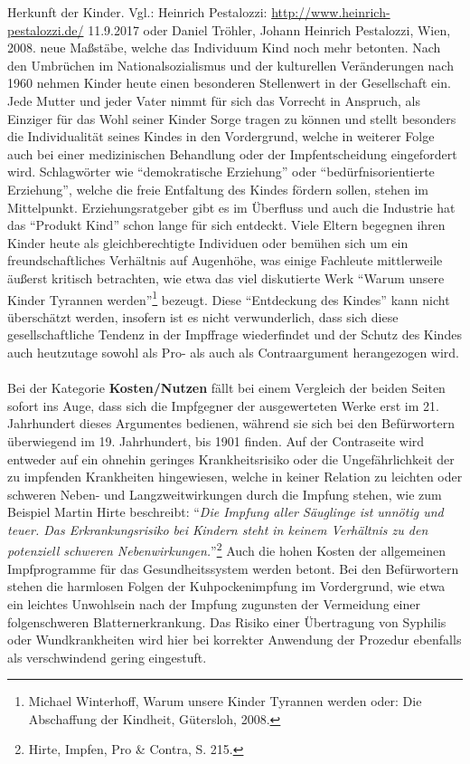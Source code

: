 \documentclass[
    a4paper,
    12pt,
    hyphens,
    chapterprefix=true,
    headheight=33pt,
    footheight=29pt,
    headings=optiontohead, %
]{scrartcl}
\begin{document}
{{Herkunft der Kinder. Vgl.: Heinrich Pestalozzi: \url{http://www.heinrich-pestalozzi.de/} 11.9.2017 oder Daniel Tröhler, Johann Heinrich
Pestalozzi, Wien, 2008.}
 neue Maßstäbe, welche das Individuum Kind noch mehr betonten. Nach den Umbrüchen im Nationalsozialismus und der kulturellen Veränderungen nach 1960 nehmen Kinder heute einen besonderen Stellenwert in der Gesellschaft ein. Jede Mutter und jeder Vater nimmt für sich das Vorrecht in Anspruch, als Einziger für das Wohl seiner Kinder Sorge tragen zu können und stellt besonders die Individualität seines Kindes in den Vordergrund, welche in weiterer Folge auch bei einer medizinischen Behandlung oder der Impfentscheidung eingefordert wird. Schlagwörter wie "`demokratische Erziehung"' oder "`bedürfnisorientierte Erziehung"', welche die freie Entfaltung des Kindes fördern sollen, stehen im Mittelpunkt. Erziehungsratgeber gibt es im Überfluss und auch die Industrie hat das "`Produkt Kind"' schon lange für sich entdeckt. Viele Eltern begegnen ihren Kinder heute als gleichberechtigte Individuen oder bemühen sich um ein freundschaftliches Verhältnis auf Augenhöhe, was einige Fachleute mittlerweile äußerst kritisch betrachten, wie etwa das viel diskutierte Werk "`Warum unsere Kinder Tyrannen werden"'\footnote{Michael Winterhoff, Warum unsere Kinder Tyrannen werden oder: Die Abschaffung der Kindheit, Gütersloh, 2008.} bezeugt. Diese "`Entdeckung des Kindes"' kann nicht überschätzt werden, insofern ist es nicht verwunderlich, dass sich diese gesellschaftliche Tendenz in der Impffrage wiederfindet und der Schutz des Kindes auch heutzutage sowohl als Pro- als auch als Contraargument herangezogen wird.\\
\\
Bei der Kategorie \textbf{Kosten/Nutzen} fällt bei einem Vergleich der beiden Seiten sofort ins Auge, dass sich die Impfgegner der ausgewerteten Werke erst im 21. Jahrhundert dieses Argumentes bedienen, während sie sich bei den Befürwortern überwiegend im 19. Jahrhundert, bis 1901 finden. Auf der Contraseite wird entweder auf ein ohnehin geringes Krankheitsrisiko oder die Ungefährlichkeit der zu impfenden Krankheiten hingewiesen, welche in keiner Relation zu leichten oder schweren Neben- und Langzweitwirkungen durch die Impfung stehen, wie zum Beispiel Martin Hirte beschreibt: "`\textit{Die Impfung aller Säuglinge ist unnötig und teuer. Das Erkrankungsrisiko bei Kindern steht in keinem Verhältnis zu den potenziell schweren Nebenwirkungen.}"'\footnote{Hirte, Impfen, Pro \& Contra, S. 215.}
 Auch die hohen Kosten der allgemeinen Impfprogramme für das Gesundheitssystem werden betont. Bei den Befürwortern stehen die harmlosen Folgen der Kuhpockenimpfung im Vordergrund, wie etwa ein leichtes Unwohlsein nach der Impfung zugunsten der Vermeidung einer folgenschweren Blatternerkrankung. Das Risiko einer Übertragung von Syphilis oder Wundkrankheiten wird hier bei korrekter Anwendung der Prozedur ebenfalls als verschwindend gering eingestuft.
}
\end{document}
